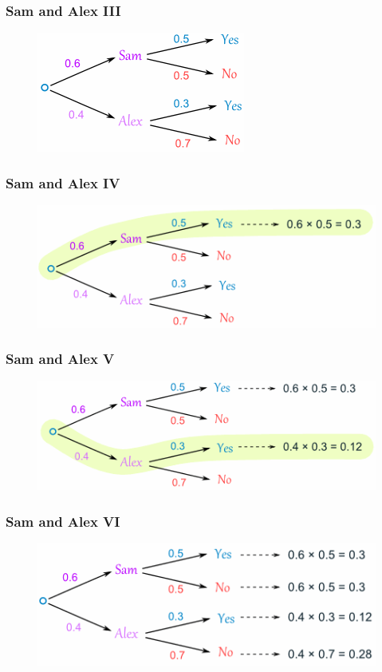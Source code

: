 \documentclass[xcolor=dvipsnames]{beamer}
\begin{document}
\begin{frame}
  \frametitle{Sam and Alex III}
\begin{figure}[h]
\includegraphics[scale=\sam]{./sam3.png}
\end{figure}
\end{frame}

\begin{frame}
  \frametitle{Sam and Alex IV}
\begin{figure}[h]
\includegraphics[scale=\sam]{./sam4.png}
\end{figure}
\end{frame}

\begin{frame}
  \frametitle{Sam and Alex V}
\begin{figure}[h]
\includegraphics[scale=\sam]{./sam5.png}
\end{figure}
\end{frame}

\begin{frame}
  \frametitle{Sam and Alex VI}
\begin{figure}[h]
\includegraphics[scale=\sam]{./sam6.png}
\end{figure}
\end{frame}
\end{document}
